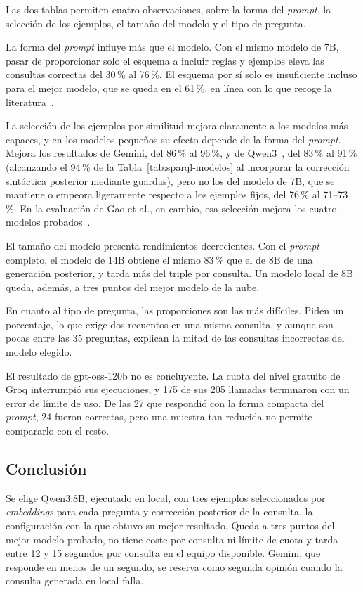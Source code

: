 \documentclass[11pt, a4paper]{report}
\begin{document}
	Las dos tablas permiten cuatro observaciones, sobre la forma del
	\textit{prompt}, la selección de los ejemplos, el tamaño del modelo y el
	tipo de pregunta.

	La forma del \textit{prompt} influye más que el modelo. Con el mismo modelo de
	7B, pasar de proporcionar solo el esquema a incluir reglas y ejemplos eleva
	las consultas correctas del 30\,\% al 76\,\%. El esquema por sí solo es
	insuficiente incluso para el mejor modelo, que se queda en el 61\,\%, en línea
	con lo que recoge la literatura~\cite{giuliani2026-sparql-llm}.

	La selección de los ejemplos por similitud mejora claramente a los modelos
	más capaces, y en los modelos pequeños su efecto depende de la forma del
	\textit{prompt}. Mejora los resultados de Gemini, del
	86\,\% al 96\,\%, y de Qwen3~\cite{qwen3}, del 83\,\% al 91\,\% (alcanzando el 94\,\% de la Tabla~\ref{tab:sparql-modelos} al incorporar la corrección sintáctica posterior mediante guardas), pero no los del modelo de
	7B, que se mantiene o empeora ligeramente respecto a los ejemplos fijos, del
	76\,\% al 71--73\,\%. En la evaluación de Gao et al., en cambio, esa
	selección mejora los cuatro modelos probados~\cite{gao2024-dailsql}.

	El tamaño del modelo presenta rendimientos decrecientes. Con el \textit{prompt} completo, el modelo de 14B obtiene el mismo 83\,\% que el de 8B
	de una generación posterior, y tarda más del triple por consulta. Un modelo local de 8B
	queda, además, a tres puntos del mejor modelo de la nube.

	En cuanto al tipo de pregunta, las proporciones son las más difíciles. Piden
	un porcentaje, lo que exige dos recuentos en una misma consulta, y aunque
	son pocas entre las 35 preguntas, explican la mitad de las consultas
	incorrectas del modelo elegido.

	El resultado de gpt-oss-120b no es concluyente. La cuota del nivel gratuito de
	Groq interrumpió sus ejecuciones, y 175 de sus 205 llamadas terminaron con un
	error de límite de uso. De las 27 que respondió con la forma compacta del
	\textit{prompt}, 24 fueron correctas, pero una muestra tan reducida no permite
	compararlo con el resto.

	\subsection{Conclusión}

	Se elige Qwen3:8B, ejecutado en local, con tres ejemplos seleccionados por
	\textit{embeddings} para cada pregunta y corrección posterior de la consulta, la configuración con la que obtuvo su mejor resultado. Queda a tres
	puntos del mejor modelo probado, no tiene coste por consulta ni límite de
	cuota y tarda entre 12 y 15 segundos por consulta en el equipo disponible. Gemini,
	que responde en menos de un segundo, se reserva como segunda opinión cuando la
	consulta generada en local falla.
\end{document}
